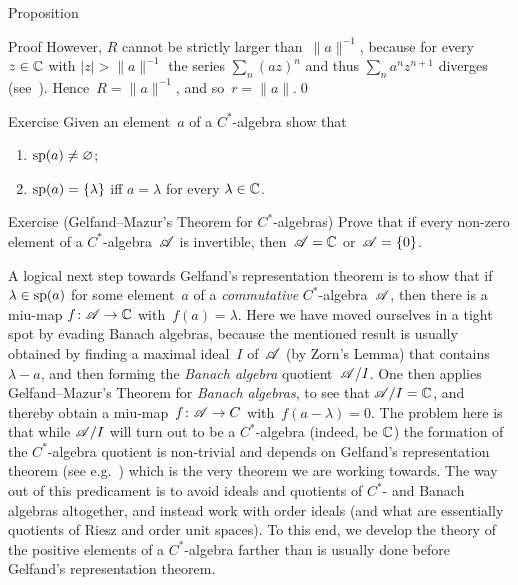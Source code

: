 \documentclass[a]{subfiles}
\begin{document}
\begin{parsec}
\begin{point}{Proposition}
\begin{point}{Proof}
However, $R$ cannot be strictly larger than~$\|a\|^{-1}$,
because for every $z\in\mathbb{C}$ with $\left|z\right|>\|a\|^{-1}$
the series $\sum_n(az)^n$ 
and thus $\sum_n a^n{z}^{n+1}$ diverges (see~).
Hence~$R=\|a\|^{-1}$, and so~$r=\|a\|$.\qed
\end{point}
\end{point}
\begin{point}{Exercise}%
Given an element~$a$ of a $C^*$-algebra show that
\begin{enumerate}
\item $\mathrm{sp}(a)\neq \varnothing$;
\item $\mathrm{sp}(a) =\{\lambda\}$ iff $a=\lambda$ for every $\lambda \in\mathbb{C}$.
\end{enumerate}
\end{point}
\begin{point}{Exercise (Gelfand--Mazur's Theorem for $C^*$-algebras)}%
Prove that if every non-zero element of a $C^*$-algebra~$\mathscr{A}$
is invertible, then~$\mathscr{A}=\mathbb{C}$ or~$\mathscr{A}=\{0\}$.
\end{point}
\begin{point}%
A logical next step
towards Gelfand's representation theorem
is to show that if~$\lambda\in\mathrm{sp}(a)$
for some element~$a$ of a \emph{commutative} $C^*$-algebra~$\mathscr{A}$,
then there is a miu-map $f\colon \mathscr{A}\to \mathbb{C}$
with~$f(a)=\lambda$.
Here we have moved ourselves in a tight spot
by evading Banach algebras,
because the mentioned result is usually obtained
by finding a maximal ideal~$I$ of~$\mathscr{A}$
(by Zorn's Lemma) that contains~$\lambda-a$,
and then forming the \emph{Banach algebra} quotient~$\mathscr{A}/I$.
One then applies Gelfand--Mazur's Theorem for \emph{Banach algebras}, 
to see that
$\mathscr{A}/I= \mathbb{C}$,
and thereby obtain a miu-map~$f\colon \mathscr{A}\to C$ with~$f(a-\lambda)=0$.
The problem here is that while $\mathscr{A}/I$
will turn out to be a $C^*$-algebra (indeed, be $\mathbb{C}$)
the formation of the $C^*$-algebra quotient
is non-trivial and depends on Gelfand's representation theorem
(see e.g.~)
which is the very theorem we are working towards.
The way out of this predicament
is to avoid ideals and quotients of $C^*$- and Banach algebras
altogether,
and instead work 
with order ideals (and what are essentially
 quotients of Riesz and order unit spaces).
To this end,
we develop the theory
of the positive elements of a $C^*$-algebra
farther than is usually done
before Gelfand's representation theorem.
\end{point}
\end{parsec}
\end{document}
